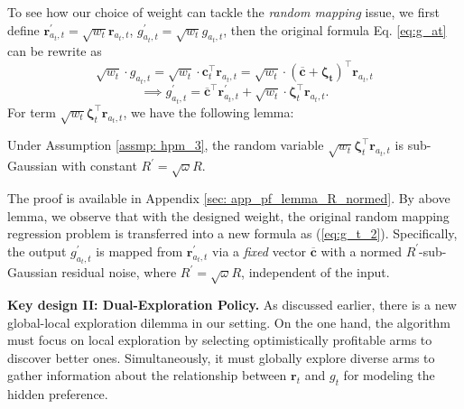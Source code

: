 To see how our choice of weight can tackle the \emph{random mapping} issue, we first define 
$\boldsymbol{r}_{a_t,t}^{\prime} = \sqrt{w_t} \boldsymbol{r}_{a_t,t}$, 
$g_{a_t,t}^{\prime} = \sqrt{w_t} g_{a_t,t}$, then the original formula Eq. \ref{eq:g_at} can be rewrite as
\[
\textstyle
\sqrt{w_t} \cdot g_{a_t,t} = \sqrt{w_t} \cdot \boldsymbol{c}_t^{\top} \boldsymbol{r}_{a_t, t} = \sqrt{w_t} \cdot (\boldsymbol{\overline{c}} + \boldsymbol{\zeta_t})^{\top} \boldsymbol{r}_{a_t, t}
\]
\begin{equation}
\label{eq:g_t_2}
\textstyle
\implies
g_{a_t,t}^{\prime} = \boldsymbol{\overline{c}}^{\top} \boldsymbol{r}_{a_t, t}^{\prime} + \sqrt{w_t} \cdot \boldsymbol{\zeta}_{t}^{\top} \boldsymbol{r}_{a_{t}, t}.
\end{equation}
For term $\sqrt{w_t} \boldsymbol{\zeta}_{t}^{\top} \boldsymbol{r}_{a_{t}, t}$, we have the following lemma:
\begin{lemma}
\label{lemma: R_normed}
Under Assumption \ref{assmp: hpm_3}, the random variable $\sqrt{w_t} \boldsymbol{\zeta}_{t}^{\top} \boldsymbol{r}_{a_{t}, t}$ is sub-Gaussian with constant $R^{\prime} = \sqrt{\omega} R$.
\end{lemma}
The proof is available in Appendix \ref{sec: app_pf_lemma_R_normed}. By above lemma, we observe that with the designed weight, the original random mapping regression problem is transferred into a new formula as (\ref{eq:g_t_2}). Specifically, the output $g_{a_t,t}^{\prime}$ is mapped from $\boldsymbol{r}_{a_t,t}^{\prime}$ via a \emph{fixed} vector $\boldsymbol{\overline{c}}$ with a normed $R^{\prime}$-sub-Gaussian residual noise, where $R^{\prime} = \sqrt{\omega} R$, independent of the input. 




\textbf{Key design II: Dual-Exploration Policy.}
As discussed earlier, there is a new global-local exploration dilemma in our setting. 
On the one hand, the algorithm must focus on local exploration by selecting optimistically profitable arms to discover better ones. Simultaneously, it must globally explore diverse arms to gather information about the relationship between $\boldsymbol{r}_t$ and $g_t$ for modeling the hidden preference.

